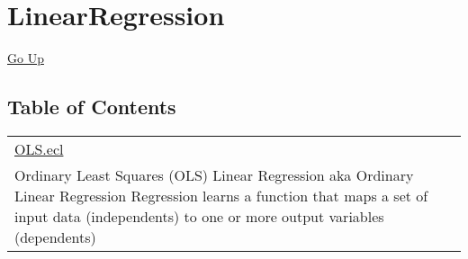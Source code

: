 \chapter*{\color{headtoc} LinearRegression}
\hypertarget{ecldoc:toc:root/LinearRegression}{}
\hyperlink{ecldoc:toc:root}{Go Up}


\section*{Table of Contents}
{\renewcommand{\arraystretch}{1.5}
\begin{longtable}{|p{\textwidth}|}
\hline
\hyperlink{ecldoc:toc:LinearRegression.OLS}{OLS.ecl} \\
Ordinary Least Squares (OLS) Linear Regression aka Ordinary Linear Regression Regression learns a function that maps a set of input data (independents) to one or more output variables (dependents) \\
\hline
\end{longtable}
}



